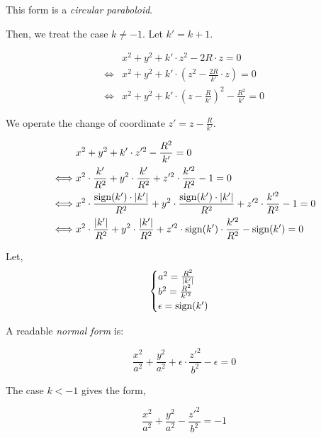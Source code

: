 This form is a \emph{circular paraboloid}.

Then, we treat the case $k \neq -1$. Let $k' = k + 1$.

\begin{equation} \begin{split}
& x^2 + y^2 + k' \cdot z^2 - 2 R \cdot z = 0 \\
\iff & x^2 + y^2 + k' \cdot \left( z^2 - \frac{2R}{k'} \cdot z\right) = 0 \\
\iff & x^2 + y^2 + k' \cdot \left( z - \frac{R}{k'} \right)^2 - \frac{R^2}{k'}
       = 0
\end{split} \end{equation}

We operate the change of coordinate $z' = z - \frac{R}{k'}$.

\begin{equation} \begin{split}
& x^2 + y^2 + k' \cdot z'^2 - \frac{R^2}{k'} = 0 \\
\iff & x^2 \cdot \frac{k'}{R^2} + y^2 \cdot \frac{k'}{R^2} +
       z'^2 \cdot \frac{k'^2}{R^2} - 1 = 0 \\
\iff & x^2 \cdot \frac{\textrm{sign}(k') \cdot \abs{k'}}{R^2} +
       y^2 \cdot \frac{\textrm{sign}(k') \cdot \abs{k'}}{R^2} +
       z'^2 \cdot \frac{k'^2}{R^2} - 1 = 0 \\
\iff & x^2 \cdot \frac{\abs{k'}}{R^2} + y^2 \cdot \frac{\abs{k'}}{R^2} +
       z'^2 \cdot \textrm{sign}(k') \cdot \frac{k'^2}{R^2} - \textrm{sign}(k')
       = 0
\end{split} \end{equation}

Let,
\begin{equation} \begin{cases}
a^2 = \frac{R^2}{\abs{k'}} \\
b^2 = \frac{R^2}{k'^2} \\
\epsilon = \textrm{sign}(k')
\end{cases} \end{equation}

A readable \emph{normal form} is:

\begin{equation}
\frac{x^2}{a^2} + \frac{y^2}{a^2} + \epsilon \cdot \frac{z'^2}{b^2} - \epsilon
  = 0
\end{equation}

The case $k < -1$ gives the form,

\begin{equation}
\frac{x^2}{a^2} + \frac{y^2}{a^2} - \frac{z'^2}{b^2} = -1
\end{equation}

